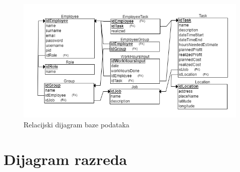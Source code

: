 				\begin{figure}[H]
					\centering
					\includegraphics[width=\textwidth]{slike/RelDijagram.png}
					\caption{Relacijski dijagram baze podataka}
				\end{figure}		
			\eject
			
			
		\section{Dijagram razreda}
		
			
			
			
			
			
